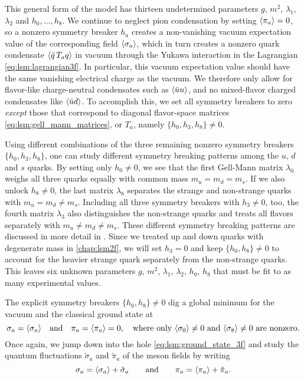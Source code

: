 This general form of the model has thirteen undetermined parameters $g$, $m^2$, $\lambda_1$, $\lambda_2$ and $h_0,\ldots,h_8$.
We continue to neglect pion condensation by setting $\langle \pi_a \rangle=0$,
so a nonzero symmetry breaker $h_a$ creates a non-vanishing vacuum expectation value of the corresponding field $\langle \sigma_a \rangle$,
which in turn creates a nonzero quark condensate $\langle \bar{q} \, T_a q \rangle$ in vacuum through the Yukawa interaction in the Lagrangian \eqref{eq:lsm:lagrangian3f}.
In particular, this vacuum expectation value should have the same vanishing electrical charge as the vacuum.
We therefore only allow for flavor-like charge-neutral condensates such as $\langle \bar{u} u \rangle$,
and no mixed-flavor charged condensates like $\langle \bar{u} d \rangle$.
To accomplish this, we set all symmetry breakers to zero \emph{except} those that correspond to diagonal flavor-space matrices \eqref{eq:lsm:gell_mann_matrices},
or $T_a$,
namely $\{h_0,h_3,h_8\} \neq 0$.

Using different combinations of the three remaining nonzero symmetry breakers $\{h_0,h_3,h_8\}$,
one can study different symmetry breaking patterns among the $u$, $d$ and $s$ quarks.
By setting only $h_0 \neq 0$, we see that the first Gell-Mann matrix $\lambda_0$ weighs all three quarks equally with common mass $m_u=m_d=m_s$.
If we also unlock $h_8 \neq 0$, the last matrix $\lambda_8$ separates the strange and non-strange quarks with $m_u = m_d \neq m_s$.
Including all three symmetry breakers with $h_3 \neq 0$, too, the fourth matrix $\lambda_3$ also distinguishes the non-strange quarks and treats all flavors separately with $m_u \neq m_d \neq m_s$.
These different symmetry breaking patterns are discussed in more detail in \cite[section III]{ref:lsm3f_details}.
Since we treated up and down quarks with degenerate mass in \cref{chap:lsm2f},
we will set $h_3 = 0$ and keep $\{h_0,h_8\} \neq 0$ to account for the heavier strange quark separately from the non-strange quarks.
This leaves six unknown parameters $g$, $m^2$, $\lambda_1$, $\lambda_2$, $h_0$, $h_8$ that must be fit to as many experimental values.

The explicit symmetry breakers $\{h_0,h_8\}\neq 0$ dig a global minimum for the vacuum and the classical ground state at
\begin{equation}
	\sigma_a = \langle \sigma_a \rangle \quad \text{and} \quad \pi_a = \langle \pi_a \rangle = 0, \quad \text{where only $\langle \sigma_0 \rangle \neq 0$ and $\langle \sigma_8 \rangle \neq 0$ are nonzero.}
\label{eq:lsm:ground_state_3f}
\end{equation}
Once again, we jump down into the hole \eqref{eq:lsm:ground_state_3f} and study the quantum fluctuations $\tilde{\sigma}_a$ and $\tilde{\pi}_a$ of the meson fields by writing
\begin{equation}
	\sigma_a = \langle \sigma_a \rangle + \tilde{\sigma}_a
	\qquad \text{and} \qquad
	\pi_a = \langle \pi_a \rangle + \tilde{\pi}_a.
\end{equation}

